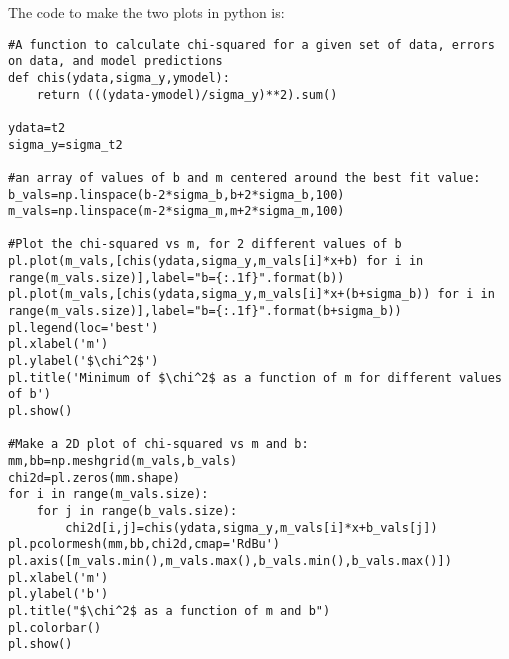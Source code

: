 The code to make the two plots in python is:
\begin{lstlisting}[frame=single] 
#A function to calculate chi-squared for a given set of data, errors on data, and model predictions
def chis(ydata,sigma_y,ymodel):
    return (((ydata-ymodel)/sigma_y)**2).sum()

ydata=t2
sigma_y=sigma_t2

#an array of values of b and m centered around the best fit value:
b_vals=np.linspace(b-2*sigma_b,b+2*sigma_b,100)
m_vals=np.linspace(m-2*sigma_m,m+2*sigma_m,100)
    
#Plot the chi-squared vs m, for 2 different values of b    
pl.plot(m_vals,[chis(ydata,sigma_y,m_vals[i]*x+b) for i in range(m_vals.size)],label="b={:.1f}".format(b))
pl.plot(m_vals,[chis(ydata,sigma_y,m_vals[i]*x+(b+sigma_b)) for i in range(m_vals.size)],label="b={:.1f}".format(b+sigma_b))
pl.legend(loc='best')
pl.xlabel('m')
pl.ylabel('$\chi^2$')
pl.title('Minimum of $\chi^2$ as a function of m for different values of b')
pl.show()

#Make a 2D plot of chi-squared vs m and b:
mm,bb=np.meshgrid(m_vals,b_vals)
chi2d=pl.zeros(mm.shape)
for i in range(m_vals.size):
    for j in range(b_vals.size):
        chi2d[i,j]=chis(ydata,sigma_y,m_vals[i]*x+b_vals[j])
pl.pcolormesh(mm,bb,chi2d,cmap='RdBu')
pl.axis([m_vals.min(),m_vals.max(),b_vals.min(),b_vals.max()])
pl.xlabel('m')
pl.ylabel('b')
pl.title("$\chi^2$ as a function of m and b")
pl.colorbar()
pl.show()
\end{lstlisting} 



